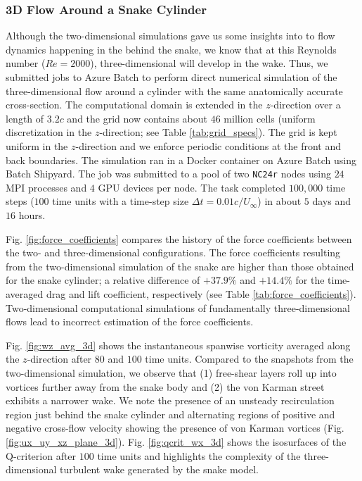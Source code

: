\documentclass[10pt,journal,compsoc]{IEEEtran}
\begin{document}
\subsubsection{3D Flow Around a Snake Cylinder}

Although the two-dimensional simulations gave us some insights into to flow dynamics happening in the behind the snake, we know that at this Reynolds number ($Re = 2000$), three-dimensional will develop in the wake.
Thus, we submitted jobs to Azure Batch to perform direct numerical simulation of the three-dimensional flow around a cylinder with the same anatomically accurate cross-section.
The computational domain is extended in the $z$-direction over a length of $3.2c$ and the grid now contains about $46$ million cells (uniform discretization in the $z$-direction; see Table \ref{tab:grid_specs}).
The grid is kept uniform in the $z$-direction and we enforce periodic conditions at the front and back boundaries.
The simulation ran in a Docker container on Azure Batch using Batch Shipyard.
The job was submitted to a pool of two \texttt{NC24r} nodes using $24$ MPI processes and $4$ GPU devices per node.
The task completed $100,000$ time steps ($100$ time units with a time-step size $\Delta t = 0.01 c / U_\infty$) in about $5$ days and $16$ hours.

Fig. \ref{fig:force_coefficients} compares the history of the force coefficients between the two- and three-dimensional configurations.
The force coefficients resulting from the two-dimensional simulation of the snake are higher than those obtained for the snake cylinder; a relative difference of $+37.9\%$ and $+14.4\%$ for the time-averaged drag and lift coefficient, respectively (see Table \ref{tab:force_coefficients}).
Two-dimensional computational simulations of fundamentally three-dimensional flows lead to incorrect estimation of the force coefficients\cite{mittal_balachandar_1995}.

Fig. \ref{fig:wz_avg_3d} shows the instantaneous spanwise vorticity averaged along the $z$-direction after $80$ and $100$ time units.
Compared to the snapshots from the two-dimensional simulation, we observe that (1) free-shear layers roll up into vortices further away from the snake body and (2) the von Karman street exhibits a narrower wake.
We note the presence of an unsteady recirculation region just behind the snake cylinder and alternating regions of positive and negative cross-flow velocity showing the presence of von Karman vortices (Fig. \ref{fig:ux_uy_xz_plane_3d}).
Fig. \ref{fig:qcrit_wx_3d} shows the isosurfaces of the Q-criterion after $100$ time units and highlights the complexity of the three-dimensional turbulent wake generated by the snake model.
\end{document}
